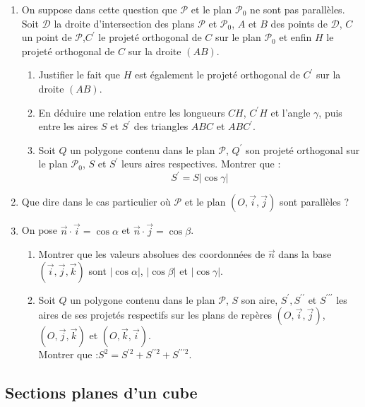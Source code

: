 \documentclass[landscape,twocolumn,leqno,a4paper,10pt]{report} %
\begin{document}
\begin{enumerate}
	\item On suppose dans cette question que $\mathscr{P}$ et le plan $\mathscr{P}_{0}$ ne sont pas parallèles.\\
	Soit $\mathscr{D}$ la droite d'intersection des plans $\mathscr{P}$ et $\mathscr{P}_{0}$, $A$ et $B$ des points de $\mathscr{D}$, $C$ un point de $\mathscr{P}$,$ C^{\prime}$ le projeté orthogonal de $C$ sur le plan $\mathscr{P}_{0}$ et enfin $H$ le projeté orthogonal de $C$ sur la droite $(A B)$.
	\begin{enumerate}
		\item Justifier le fait que $H$ est également le projeté orthogonal de $C^{\prime}$ sur la droite $(A B)$.
		\item En déduire une relation entre les longueurs $C H$, $C^{\prime} H$ et l'angle $\gamma$, puis entre les aires $S$ et $S^{\prime}$ des triangles $A B C$ et $A B C^{\prime}$.
		\item Soit $Q$ un polygone contenu dans le plan $\mathscr{P}$, $Q^{\prime}$ son projeté orthogonal sur le plan $\mathscr{P}_{0}$, $S$ et $S^{\prime}$ leurs aires respectives. Montrer que :
		$$S^{\prime}=S|\cos \gamma|$$
	\end{enumerate}
	\item Que dire dans le cas particulier où $\mathscr{P}$ et le plan $(O, \vec{i}, \vec{j})$ sont parallèles ?
	\item On pose $\vec{n} \cdot \vec{i}=\cos \alpha$ et $\vec{n} \cdot \vec{j}=\cos \beta$.
	\begin{enumerate}
		\item Montrer que les valeurs absolues des coordonnées de $\vec{n}$ dans la base $(\vec{i}, \vec{j}, \vec{k})$ sont $|\cos \alpha|$, $|\cos \beta|$ et $|\cos \gamma|$.
		\item Soit $Q$ un polygone contenu dans le plan $\mathscr{P}$, $S$ son aire, $S^{\prime}, S^{\prime \prime}$ et $S^{\prime \prime \prime}$ les aires de ses projetés respectifs sur les plans de repères $(O, \vec{i}, \vec{j})$, $(O, \vec{j}, \vec{k})$ et $(O, \vec{k}, \vec{i})$.\\
		 Montrer que :\quad $ S^{2}=S^{\prime 2}+S^{\prime \prime 2}+S^{\prime \prime \prime 2}$.
	\end{enumerate}
\end{enumerate}

\newpage

\subsection{Sections planes d'un cube}
\end{document}
